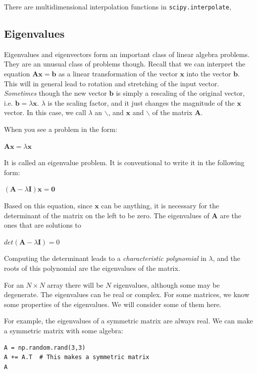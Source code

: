 \documentclass[11pt]{article}
\begin{document}
There are multidimensional interpolation functions in \texttt{scipy.interpolate},


\subsection{Eigenvalues}
\label{sec:org4bea841}

Eigenvalues and eigenvectors form an important class of linear algebra problems. They are an unusual class of problems though. Recall that we can interpret the equation \(\mathbf{A}\mathbf{x} = \mathbf{b}\) as a linear transformation of the vector \(\mathbf{x}\) into the vector \(\mathbf{b}\). This will in general lead to rotation and stretching of the input vector. \emph{Sometimes} though the new vector \(\mathbf{b}\) is simply a rescaling of the original vector, i.e. \(\mathbf{b} = \lambda \mathbf{x}\). \(\lambda\) is the scaling factor, and it just changes the magnitude of the \(\mathbf{x}\) vector. In this case, we call \(\lambda\) an \eigenvalue$\backslash$, and \(\mathbf{x}\) and \eigenvector$\backslash$ of the matrix \(\mathbf{A}\).

When you see a problem in the form:

\(\mathbf{A}\mathbf{x} = \lambda \mathbf{x}\)

It is called an eigenvalue problem. It is conventional to write it in the following form:

\((\mathbf{A} - \lambda \mathbf{I})\mathbf{x} = \mathbf{0}\)

Based on this equation, since \(\mathbf{x}\) can be anything, it is necessary for the determinant of the matrix on the left to be zero. The eigenvalues of \(\mathbf{A}\) are the ones that are solutions to

\(det(\mathbf{A} - \lambda \mathbf{I}) = 0\)

Computing the determinant leads to a \emph{characteristic polynomial} in \(\lambda\), and the roots of this polynomial are the eigenvalues of the matrix.

For an \(N \times N\) array there will be \(N\) eigenvalues, although some may be degenerate. The eigenvalues can be real or complex. For some matrices, we know some properties of the eigenvalues. We will consider some of them here.

For example, the eigenvalues of a symmetric matrix are always real. We can make a symmetric matrix with some algebra:

\begin{verbatim}
A = np.random.rand(3,3)
A += A.T  # This makes a symmetric matrix
A
\end{verbatim}
\end{document}
